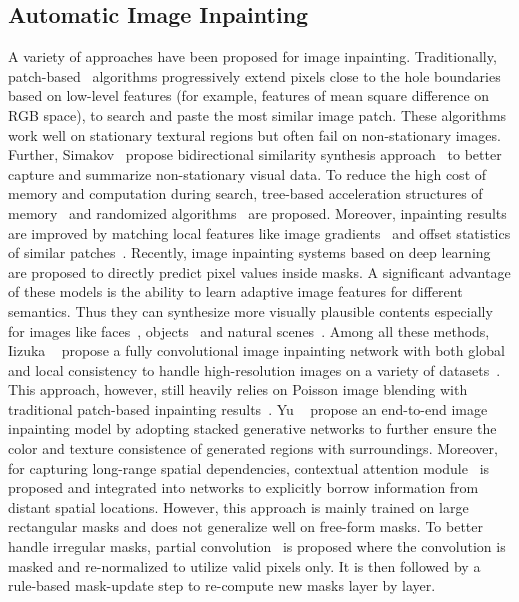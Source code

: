 \documentclass[10pt,twocolumn,letterpaper]{article}
\begin{document}
\subsection{Automatic Image Inpainting}
A variety of approaches have been proposed for image inpainting. Traditionally, 
patch-based~\cite{efros2001image, efros1999texture} algorithms progressively extend pixels close to the hole boundaries based on low-level features (for example, features of mean square difference on RGB space), to search and paste the most similar image patch. These algorithms work well on stationary textural regions but often fail on non-stationary images. Further, Simakov \etal~propose bidirectional similarity synthesis approach~\cite{simakov2008summarizing} to better capture and summarize non-stationary visual data. To reduce the high cost of memory and computation during search, tree-based acceleration structures of memory~\cite{mount1998ann} and randomized algorithms~\cite{barnes2009patchmatch} are proposed. 
Moreover, inpainting results are improved by matching local features like image gradients~\cite{ballester2001filling, darabi2012image} and offset statistics of similar patches~\cite{he2014image}.
Recently, image inpainting systems based on deep learning are proposed to directly predict pixel values inside masks. A significant advantage of these models is the ability to learn adaptive image features for different semantics. Thus they can synthesize more visually plausible contents especially for images like faces~\cite{li2017generative, yeh2017semantic}, objects~\cite{pathak2016context} and natural scenes~\cite{iizuka2017globally, yu2018generative}. Among all these methods, Iizuka \etal~\cite{iizuka2017globally} propose a fully convolutional image inpainting network with both global and local consistency to handle high-resolution images on a variety of datasets~\cite{karras2017progressive, russakovsky2015imagenet, zhou2017places}. This approach, however, still heavily relies on Poisson image blending with traditional patch-based inpainting results~\cite{he2014image}. Yu \etal~\cite{yu2018generative} propose an end-to-end image inpainting model by adopting stacked generative networks to further ensure the color and texture consistence of generated regions with surroundings. Moreover, for capturing long-range spatial dependencies, contextual attention module~\cite{yu2018generative} is proposed and integrated into networks to explicitly borrow information from distant spatial locations. However, this approach is mainly trained on large rectangular masks and does not generalize well on free-form masks. To better handle irregular masks, partial convolution~\cite{liu2018image} is proposed where the convolution is masked and re-normalized to utilize valid pixels only. It is then followed by a rule-based mask-update step to re-compute new masks layer by layer.
\end{document}
